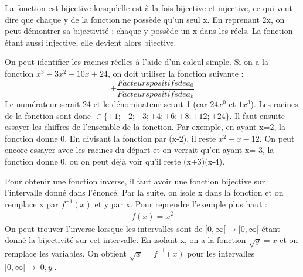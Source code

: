 \documentclass[10pt, french]{article}
\begin{document}
\begin{multicols*}{2}
\begin{definitionNOHFILL}
La fonction est bijective lorsqu'elle est à la fois bijective et injective, ce qui veut dire que chaque y de la fonction ne possède qu'un seul x. En reprenant 2x, on peut démontrer sa bijectivité : chaque y possède un x dans les réels. La fonction étant aussi injective, elle devient alors bijective.
\end{definitionNOHFILL}

\begin{definitionNOHFILL}
On peut identifier les racines réelles à l'aide d'un calcul simple. Si on a la fonction $ x^{3}-3x^{2}-10x+24 $, on doit utiliser la fonction suivante : \\
  \begin{equation*}
			\pm \frac{Facteurs positifs de a_{0}}{Facteurs positifs de a_{k}}
	\end{equation*}
Le numérateur serait 24 et le dénominateur serait 1 (car $24x^{0}$ et $1x^{3}$). Les racines de la fonction sont donc $\in \{ {\pm 1; \pm 2; \pm 3; \pm 4; \pm 6; \pm 8; \pm 12; \pm 24} \}$. Il faut ensuite essayer les chiffres de l'ensemble de la fonction. Par exemple, en ayant x=2, la fonction donne 0. En divisant la fonction par (x-2), il reste $x^{2}-x-12$. On peut encore essayer avec les racines du départ et on verrait qu'en ayant x=-3, la fonction donne 0, ou on peut déjà voir qu'il reste (x+3)(x-4).
\end{definitionNOHFILL}

\begin{definitionNOHFILL}
Pour obtenir une fonction inverse, il faut avoir une fonction bijective sur l'intervalle donné dans l'énoncé. Par la suite, on isole x dans la fonction et on remplace x par $f^{-1}(x)$ et y par x. Pour reprendre l'exemple plus haut :
  \begin{align*}
  f(x) = x^{2}
  \end{align*}
On peut trouver l'inverse lorsque les intervalles sont de $[ 0, \infty [ \rightarrow [ 0, \infty [$ étant donné la bijectivité sur cet intervalle. En isolant x, on a la fonction $\sqrt{y} = x$ et on remplace les variables. On obtient $\sqrt{x} = f^{-1}(x)$ pour les intervalles $[ 0, \infty [ \rightarrow [ 0, y [$. 
\end{definitionNOHFILL}


\end{multicols*}
\end{document}
